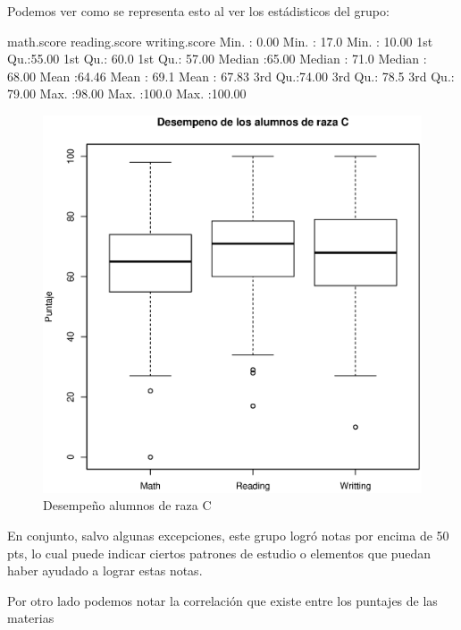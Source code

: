 \documentclass{article}
\begin{document}
Podemos ver como se representa esto al ver los est\'adisticos del grupo:
\begin{rc}

    math.score    reading.score   writing.score   
Min.   : 0.00   Min.   : 17.0   Min.   : 10.00  
1st Qu.:55.00   1st Qu.: 60.0   1st Qu.: 57.00  
Median :65.00   Median : 71.0   Median : 68.00  
Mean   :64.46   Mean   : 69.1   Mean   : 67.83  
3rd Qu.:74.00   3rd Qu.: 78.5   3rd Qu.: 79.00  
Max.   :98.00   Max.   :100.0   Max.   :100.00
\end{rc}
\begin{figure}[H]
    \centering
    \includegraphics[scale = 0.6]{Output/Plots/DesempenoAlumnosRazaC.eps}
    \caption{Desempe\~no alumnos de raza C}
    \label{fig:minipage1}
\end{figure}

En conjunto, salvo algunas excepciones, este grupo logr\'o notas por encima de 50 pts, lo cual puede indicar ciertos
patrones de estudio o elementos que puedan haber ayudado a lograr estas notas.

Por otro lado podemos notar la correlaci\'on que existe entre los puntajes de las materias
\end{document}
